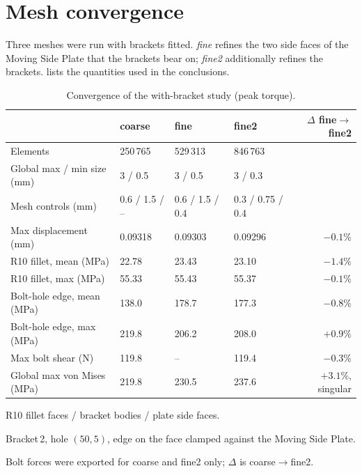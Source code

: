 \documentclass[11pt,letterpaper]{article}
\begin{document}
\section{Mesh convergence}
Three meshes were run with brackets fitted. \emph{fine} refines the two side faces of the
Moving Side Plate that the brackets bear on; \emph{fine2} additionally refines the brackets.
 lists the quantities used in the conclusions.

\begin{table}[H]
\centering
\begin{threeparttable}
\caption{Convergence of the with-bracket study (peak torque).}
\label{tab:conv}
\small\setlength{\tabcolsep}{5pt}
\begin{tabular}{@{}llllr@{}}
\toprule
 & coarse & fine & fine2 & $\Delta$ fine$\to$fine2\\
\midrule
Elements                            & 250\,765 & 529\,313 & 846\,763 & \\
Global max / min size (mm)          & 3 / 0.5 & 3 / 0.5 & 3 / 0.3 & \\
Mesh controls (mm)\tnote{a}         & 0.6 / 1.5 / -- & 0.6 / 1.5 / 0.4 & 0.3 / 0.75 / 0.4 & \\
\midrule
Max displacement (mm)               & 0.09318 & 0.09303 & 0.09296 & $-0.1\%$ \\
R10 fillet, mean (MPa)              & 22.78 & 23.43 & 23.10 & $-1.4\%$ \\
R10 fillet, max (MPa)               & 55.33 & 55.43 & 55.37 & $-0.1\%$ \\
Bolt-hole edge, mean (MPa)\tnote{b} & 138.0 & 178.7 & 177.3 & $-0.8\%$ \\
Bolt-hole edge, max (MPa)\tnote{b}  & 219.8 & 206.2 & 208.0 & $+0.9\%$ \\
Max bolt shear (N)\tnote{c}         & 119.8 & -- & 119.4 & $-0.3\%$ \\
Global max von Mises (MPa)          & 219.8 & 230.5 & 237.6 & $+3.1\%$, singular \\
\bottomrule
\end{tabular}
\begin{tablenotes}\footnotesize
\item[a] R10 fillet faces / bracket bodies / plate side faces.
\item[b] Bracket\,2, hole $(50,5)$, edge on the face clamped against the Moving Side Plate.
\item[c] Bolt forces were exported for coarse and fine2 only; $\Delta$ is coarse$\to$fine2.
\end{tablenotes}
\end{threeparttable}
\end{table}
\end{document}
